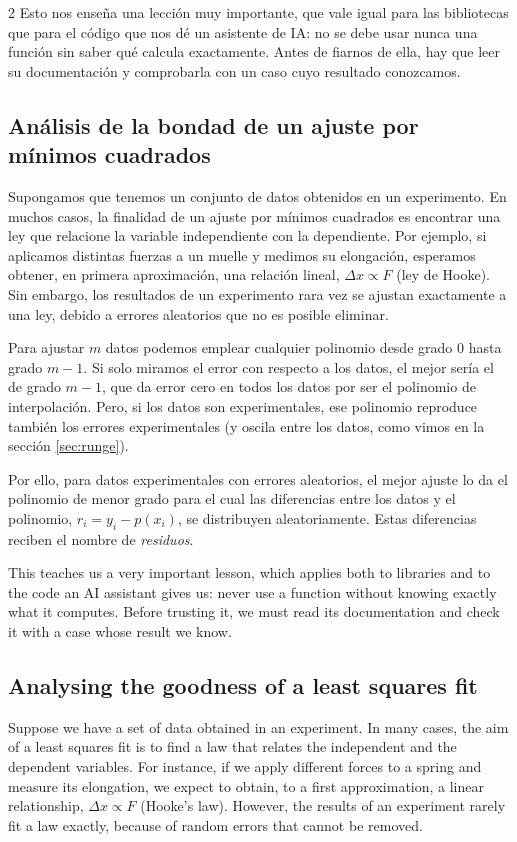 \begin{paracol}{2}
Esto nos enseña una lección muy importante, que vale igual para las bibliotecas que para el código que nos dé un asistente de IA: no se debe usar nunca una función sin saber qué calcula exactamente. Antes de fiarnos de ella, hay que leer su documentación y comprobarla con un caso cuyo resultado conozcamos.

\subsection{Análisis de la bondad de un ajuste por mínimos cuadrados} 
Supongamos que tenemos un conjunto de datos obtenidos en un experimento. En muchos casos, la finalidad de un ajuste por mínimos cuadrados es encontrar una ley que relacione la variable independiente con la dependiente. Por ejemplo, si aplicamos distintas fuerzas a un muelle y medimos su elongación, esperamos obtener, en primera aproximación, una relación lineal, $\Delta x\propto F$ (ley de Hooke). Sin embargo, los resultados de un experimento rara vez se ajustan exactamente a una ley, debido a errores aleatorios que no es posible eliminar.

Para ajustar $m$ datos podemos emplear cualquier polinomio desde grado $0$ hasta grado $m-1$. Si solo miramos el error con respecto a los datos, el mejor sería el de grado $m-1$, que da error cero en todos los datos por ser el polinomio de interpolación. Pero, si los datos son experimentales, ese polinomio reproduce también los errores experimentales (y oscila entre los datos, como vimos en la sección \ref{sec:runge}).

Por ello, para datos experimentales con errores aleatorios, el mejor ajuste lo da el polinomio de menor grado para el cual las diferencias entre los datos y el polinomio, $r_i=y_i-p(x_i)$, se distribuyen aleatoriamente. Estas diferencias reciben el nombre de \emph{residuos}. 

\switchcolumn
This teaches us a very important lesson, which applies both to libraries and to the code an AI assistant gives us: never use a function without knowing exactly what it computes. Before trusting it, we must read its documentation and check it with a case whose result we know.

\subsection{Analysing the goodness of a least squares fit}
Suppose we have a set of data obtained in an experiment. In many cases, the aim of a least squares fit is to find a law that relates the independent and the dependent variables. For instance, if we apply different forces to a spring and measure its elongation, we expect to obtain, to a first approximation, a linear relationship, $\Delta x\propto F$ (Hooke's law). However, the results of an experiment rarely fit a law exactly, because of random errors that cannot be removed.


\end{paracol}
